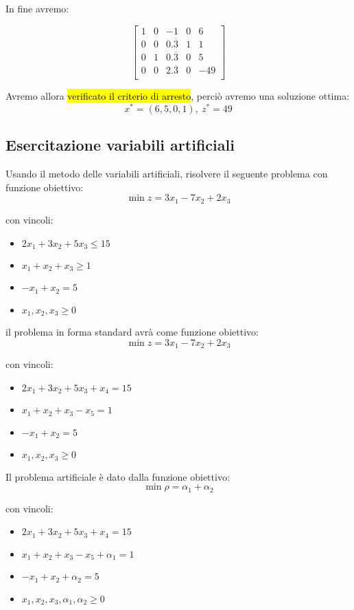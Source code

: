 In fine avremo:


$$
\left[ {\begin{array}{ccccc}
	1 & 0 & -1 & 0 & 6\\
	0 & 0 & 0.\overline{3} & 1 & 1\\
	0 & 1 & 0.\overline{3} & 0 & 5\\
	0 & 0 & 2.\overline{3} & 0 & -49\\
\end{array} } \right]
$$

Avremo allora \hl{verificato il criterio di arresto}, perciò avremo una soluzione ottima:
$$x^* = (6, 5, 0, 1),\ z^* = 49$$


\subsection{Esercitazione variabili artificiali}

Usando il metodo delle variabili artificiali, risolvere il seguente problema con funzione obiettivo:
$$\min z = 3x_1 - 7x_2 + 2x_3$$

con vincoli:

\begin{itemize}
	\item $2x_1 + 3x_2 + 5x_3 \leq 15$
	\item $x_1 + x_2 + x_3 \geq 1$
	\item $-x_1 + x_2 = 5$
	\item $x_1, x_2, x_3 \geq 0$
\end{itemize}

il problema in forma standard avrà come funzione obiettivo:
$$\min z = 3x_1 - 7x_2 + 2x_3$$

con vincoli:

\begin{itemize}
	\item $2x_1 + 3x_2 + 5x_3 + x_4 = 15$
	\item $x_1 + x_2 + x_3 - x_5 = 1$
	\item $-x_1 + x_2 = 5$
	\item $x_1, x_2, x_3 \geq 0$
\end{itemize}

Il problema artificiale è dato dalla funzione obiettivo:
$$\min \rho = \alpha_1 + \alpha_2$$

con vincoli:

\begin{itemize}
	\item $2x_1 + 3x_2 + 5x_3 + x_4 = 15$
	\item $x_1 + x_2 + x_3 - x_5 + \alpha_1 = 1$
	\item $-x_1 + x_2 + \alpha_2 = 5$
	\item $x_1, x_2, x_3, \alpha_1, \alpha_2 \geq 0$
\end{itemize}

